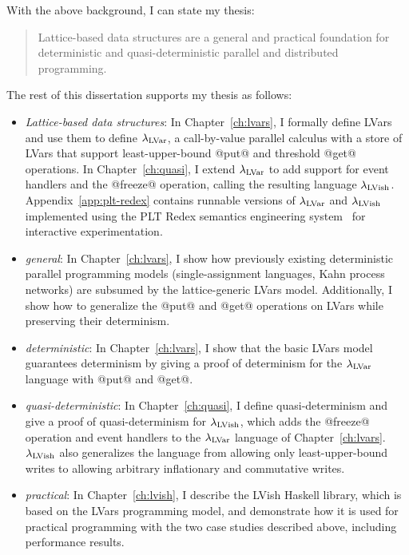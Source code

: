 With the above background, I can state my thesis:
\begin{quote}
  Lattice-based data structures are a general and practical foundation
  for deterministic and quasi-deterministic parallel and distributed
  programming.
\end{quote}
The rest of this dissertation supports my thesis as follows:
\begin{itemize}
  \item \emph{Lattice-based data structures}: In
    Chapter~\ref{ch:lvars}, I formally define LVars and use them to
    define $\lambda_{\textrm{LVar}}$, a call-by-value parallel calculus with a
    store of LVars that support least-upper-bound @put@ and threshold
    @get@ operations. In Chapter~\ref{ch:quasi}, I extend
    $\lambda_{\textrm{LVar}}$ to add support for event handlers and the @freeze@
    operation, calling the resulting language $\lambda_{\textrm{LVish}}$.
    Appendix~\ref{app:plt-redex} contains runnable versions of
    $\lambda_{\textrm{LVar}}$ and $\lambda_{\textrm{LVish}}$ implemented using the PLT Redex
    semantics engineering system~\cite{redex-book} for interactive
    experimentation.

  \item \emph{general}: In Chapter~\ref{ch:lvars}, I show how
    previously existing deterministic parallel programming models
    (single-assignment languages, Kahn process networks) are subsumed
    by the lattice-generic LVars model.  Additionally, I show how to
    generalize the @put@ and @get@ operations on LVars while
    preserving their determinism.

  \item \emph{deterministic}: In Chapter~\ref{ch:lvars}, I show that
    the basic LVars model guarantees determinism by giving a proof of
    determinism for the $\lambda_{\textrm{LVar}}$ language with @put@ and @get@.

  \item \emph{quasi-deterministic}: In Chapter~\ref{ch:quasi}, I
    define quasi-determinism and give a proof of quasi-determinism for
    $\lambda_{\textrm{LVish}}$, which adds the @freeze@ operation and event
    handlers to the $\lambda_{\textrm{LVar}}$ language of Chapter~\ref{ch:lvars}.
    $\lambda_{\textrm{LVish}}$ also generalizes the language from allowing only
    least-upper-bound writes to allowing arbitrary inflationary and
    commutative writes.

  \item \emph{practical}: In Chapter~\ref{ch:lvish}, I describe the
    LVish Haskell library, which is based on the LVars programming
    model, and demonstrate how it is used for practical programming
    with the two case studies described above, including performance
    results.


\end{itemize}
